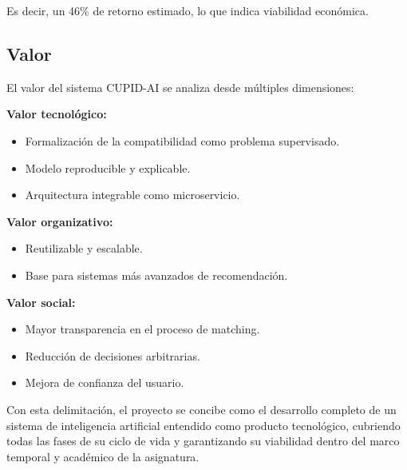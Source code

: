 Es decir, un 46\% de retorno estimado, lo que indica viabilidad económica.

\subsection{Valor}

El valor del sistema CUPID-AI se analiza desde múltiples dimensiones:

\textbf{Valor tecnológico:}
\begin{itemize}
    \item Formalización de la compatibilidad como problema supervisado.
    \item Modelo reproducible y explicable.
    \item Arquitectura integrable como microservicio.
\end{itemize}

\textbf{Valor organizativo:}
\begin{itemize}
    \item Reutilizable y escalable.
    \item Base para sistemas más avanzados de recomendación.
\end{itemize}

\textbf{Valor social:}
\begin{itemize}
    \item Mayor transparencia en el proceso de matching.
    \item Reducción de decisiones arbitrarias.
    \item Mejora de confianza del usuario.
\end{itemize}


Con esta delimitación, el proyecto se concibe como el desarrollo completo de un sistema de inteligencia artificial entendido como producto tecnológico, cubriendo todas las fases de su ciclo de vida y garantizando su viabilidad dentro del marco temporal y académico de la asignatura.
